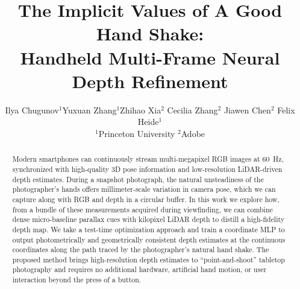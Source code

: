 \documentclass[final]{cvpr}
\begin{document}
\title{The Implicit Values of A Good Hand Shake:\\Handheld Multi-Frame Neural Depth Refinement
}

\author{Ilya Chugunov$^1$\quad  Yuxuan Zhang$^1$\quad  Zhihao Xia$^2$ \quad Cecilia Zhang$^2$  \quad Jiawen Chen$^2$ \quad Felix Heide$^1$ \vspace{5pt}\\
$^1$Princeton University \quad $^2$Adobe}

\maketitle


\begin{abstract}
    Modern smartphones can continuously stream multi-megapixel RGB images at 60~Hz, synchronized with high-quality 3D pose information and low-resolution LiDAR-driven depth estimates. During a snapshot photograph, the natural unsteadiness of the photographer's hands offers millimeter-scale variation in camera pose, which we can capture along with RGB and depth in a circular buffer. In this work we explore how, from a bundle of these measurements acquired during viewfinding, we can combine dense micro-baseline parallax cues with kilopixel LiDAR depth to distill a high-fidelity depth map. We take a test-time optimization approach and train a coordinate MLP to output photometrically and geometrically consistent depth estimates at the continuous coordinates along the path traced by the photographer's natural hand shake. The proposed method brings high-resolution depth estimates to ``point-and-shoot'' tabletop photography and requires no additional hardware, artificial hand motion, or user interaction beyond the press of a button.
\end{abstract}
\vspace{-1em}








{\small


}
\end{document}
